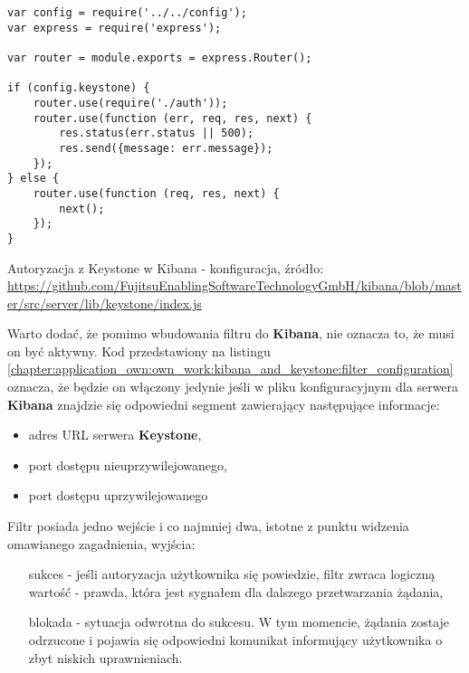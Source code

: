     \begin{listing}
        \begin{verbatim}
var config = require('../../config');
var express = require('express');

var router = module.exports = express.Router();

if (config.keystone) {
    router.use(require('./auth'));
    router.use(function (err, req, res, next) {
        res.status(err.status || 500);
        res.send({message: err.message});
    });
} else {
    router.use(function (req, res, next) {
        next();
    });
}
        \end{verbatim}
        \label{chapter:application_own:own_work:kibana_and_keystone:filter_configuration}
        \caption[Autoryzacja z Keystone w Kibana - konfiguracja]{Autoryzacja z Keystone w Kibana - konfiguracja, źródło: \url{https://github.com/FujitsuEnablingSoftwareTechnologyGmbH/kibana/blob/master/src/server/lib/keystone/index.js}}
    \end{listing}
    
    Warto dodać, że pomimo wbudowania filtru do \textbf{Kibana}, nie oznacza to, że musi on być aktywny. Kod
    przedstawiony na listingu \ref{chapter:application_own:own_work:kibana_and_keystone:filter_configuration} oznacza,
    że będzie on włączony jedynie jeśli w pliku konfiguracyjnym dla serwera \textbf{Kibana} znajdzie się odpowiedni
    segment zawierający następujące informacje:
    \begin{itemize}
        \item adres URL serwera \textbf{Keystone},
        \item port dostępu nieuprzywilejowanego,
        \item port dostępu uprzywilejowanego
    \end{itemize}
    
    Filtr posiada jedno wejście i co najmniej dwa, istotne z punktu widzenia omawianego zagadnienia, wyjścia:
    \begin{itemize}
        \item[sukces] - jeśli autoryzacja użytkownika się powiedzie, filtr zwraca logiczną wartość - prawda,
        która jest sygnałem dla dalszego przetwarzania żądania,
        \item[blokada] - sytuacja odwrotna do sukcesu. W tym momencie, żądania zostaje odrzucone
        i pojawia się odpowiedni komunikat informujący użytkownika o zbyt niskich uprawnieniach.
    \end{itemize}
    
